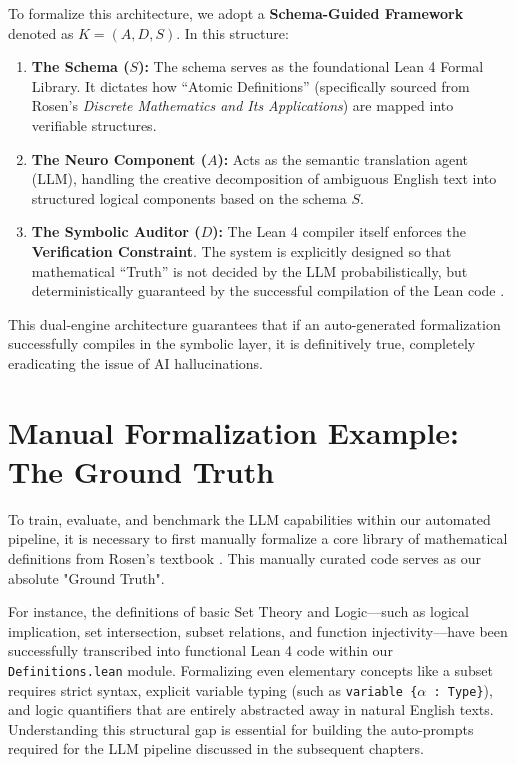 To formalize this architecture, we adopt a \textbf{Schema-Guided Framework} denoted as $K = (A, D, S)$. In this structure:
\begin{enumerate}
    \item \textbf{The Schema ($S$):} The schema serves as the foundational Lean 4 Formal Library. It dictates how ``Atomic Definitions'' (specifically sourced from Rosen's \textit{Discrete Mathematics and Its Applications}) are mapped into verifiable structures.
    \item \textbf{The Neuro Component ($A$):} Acts as the semantic translation agent (LLM), handling the creative decomposition of ambiguous English text into structured logical components based on the schema $S$.
    \item \textbf{The Symbolic Auditor ($D$):} The Lean 4 compiler itself enforces the \textbf{Verification Constraint}. The system is explicitly designed so that mathematical ``Truth'' is not decided by the LLM probabilistically, but deterministically guaranteed by the successful compilation of the Lean code \cite{llm_math, symbolic_ai}.
\end{enumerate}
This dual-engine architecture guarantees that if an auto-generated formalization successfully compiles in the symbolic layer, it is definitively true, completely eradicating the issue of AI hallucinations.

\section{Manual Formalization Example: The Ground Truth}
To train, evaluate, and benchmark the LLM capabilities within our automated pipeline, it is necessary to first manually formalize a core library of mathematical definitions from Rosen's textbook \cite{rosen2019}. This manually curated code serves as our absolute "Ground Truth". 

For instance, the definitions of basic Set Theory and Logic—such as logical implication, set intersection, subset relations, and function injectivity—have been successfully transcribed into functional Lean 4 code within our \texttt{Definitions.lean} module. Formalizing even elementary concepts like a subset requires strict syntax, explicit variable typing (such as \texttt{variable \{$\alpha$ : Type\}}), and logic quantifiers that are entirely abstracted away in natural English texts. Understanding this structural gap is essential for building the auto-prompts required for the LLM pipeline discussed in the subsequent chapters.

